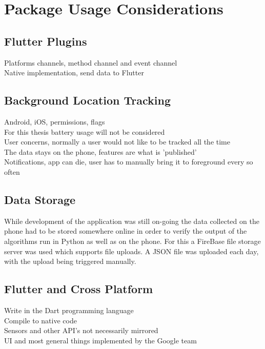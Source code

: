 \section{Package Usage Considerations}
\subsection{Flutter Plugins}
Platforms channels, method channel and event channel\\
Native implementation, send data to Flutter\\

\subsection{Background Location Tracking}
Android, iOS, permissions, flags\\
For this thesis battery usage will not be considered\\
User concerns, normally a user would not like to be tracked all the time\\
The data stays on the phone, features are what is 'published'\\
Notifications, app can die, user has to manually bring it to foreground every so often\\

\subsection{Data Storage}
While development of the application was still on-going the data collected on the phone had to be stored somewhere online in order to verify the output of the algorithms run in Python as well as on the phone. For this a FireBase file storage server was used which supports file uploads. A JSON file was uploaded each day, with the upload being triggered manually. 

\subsection{Flutter and Cross Platform}
Write in the Dart programming language\\
Compile to native code\\
Sensors and other API's not necessarily mirrored\\
UI and most general things implemented by the Google team\\